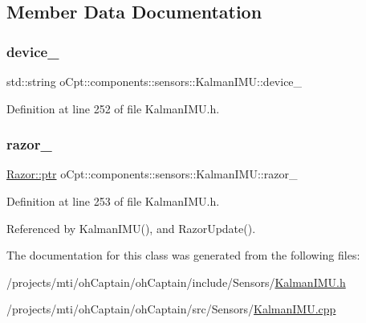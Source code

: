\subsection{Member Data Documentation}
\hypertarget{classo_cpt_1_1components_1_1sensors_1_1_kalman_i_m_u_a483d7e4a39dce51d4bbd826fef6a9870}{}\label{classo_cpt_1_1components_1_1sensors_1_1_kalman_i_m_u_a483d7e4a39dce51d4bbd826fef6a9870} 
\subsubsection{\texorpdfstring{device\+\_\+}{device\_}}
{\footnotesize\ttfamily std\+::string o\+Cpt\+::components\+::sensors\+::\+Kalman\+I\+M\+U\+::device\+\_\+\hspace{0.3cm}{\ttfamily [private]}}



Definition at line 252 of file Kalman\+I\+M\+U.\+h.

\hypertarget{classo_cpt_1_1components_1_1sensors_1_1_kalman_i_m_u_a65e72cc0e903c472b2ddca84d227c50c}{}\label{classo_cpt_1_1components_1_1sensors_1_1_kalman_i_m_u_a65e72cc0e903c472b2ddca84d227c50c} 
\subsubsection{\texorpdfstring{razor\+\_\+}{razor\_}}
{\footnotesize\ttfamily \hyperlink{classo_cpt_1_1i_sensor_a03533d2c5dc66e332d70dbb3b5e3006a}{Razor\+::ptr} o\+Cpt\+::components\+::sensors\+::\+Kalman\+I\+M\+U\+::razor\+\_\+\hspace{0.3cm}{\ttfamily [private]}}



Definition at line 253 of file Kalman\+I\+M\+U.\+h.



Referenced by Kalman\+I\+M\+U(), and Razor\+Update().



The documentation for this class was generated from the following files\+:\begin{DoxyCompactItemize}
\item 
/projects/mti/oh\+Captain/oh\+Captain/include/\+Sensors/\hyperlink{_kalman_i_m_u_8h}{Kalman\+I\+M\+U.\+h}\item 
/projects/mti/oh\+Captain/oh\+Captain/src/\+Sensors/\hyperlink{_kalman_i_m_u_8cpp}{Kalman\+I\+M\+U.\+cpp}\end{DoxyCompactItemize}
